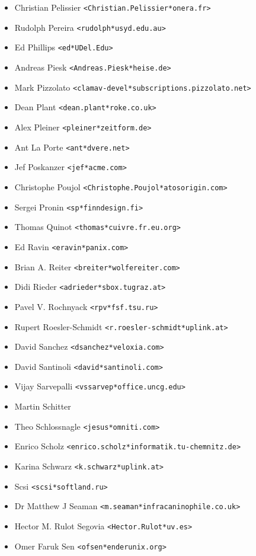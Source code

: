 \documentclass[a4paper,titlepage,12pt]{article}
\newcommand{\email}[1]{\texttt{#1}}
\begin{document}
\begin{itemize}
	\item Christian Pelissier \email{<Christian.Pelissier*onera.fr>}
	\item Rudolph Pereira \email{<rudolph*usyd.edu.au>}
	\item Ed Phillips \email{<ed*UDel.Edu>}
	\item Andreas Piesk \email{<Andreas.Piesk*heise.de>}
	\item Mark Pizzolato \email{<clamav-devel*subscriptions.pizzolato.net>}
	\item Dean Plant \email{<dean.plant*roke.co.uk>}
	\item Alex Pleiner \email{<pleiner*zeitform.de>}
	\item Ant La Porte \email{<ant*dvere.net>}
	\item Jef Poskanzer \email{<jef*acme.com>}
	\item Christophe Poujol \email{<Christophe.Poujol*atosorigin.com>}
	\item Sergei Pronin \email{<sp*finndesign.fi>}
	\item Thomas Quinot \email{<thomas*cuivre.fr.eu.org>}
	\item Ed Ravin \email{<eravin*panix.com>}
	\item Brian A. Reiter \email{<breiter*wolfereiter.com>}
	\item Didi Rieder \email{<adrieder*sbox.tugraz.at>}
	\item Pavel V. Rochnyack \email{<rpv*fsf.tsu.ru>}
	\item Rupert Roesler-Schmidt \email{<r.roesler-schmidt*uplink.at>}
	\item David Sanchez \email{<dsanchez*veloxia.com>}
	\item David Santinoli \email{<david*santinoli.com>}
	\item Vijay Sarvepalli \email{<vssarvep*office.uncg.edu>}
	\item Martin Schitter
	\item Theo Schlossnagle \email{<jesus*omniti.com>}
	\item Enrico Scholz \email{<enrico.scholz*informatik.tu-chemnitz.de>}
	\item Karina Schwarz \email{<k.schwarz*uplink.at>}
	\item Scsi \email{<scsi*softland.ru>}
	\item Dr Matthew J Seaman \email{<m.seaman*infracaninophile.co.uk>}
	\item Hector M. Rulot Segovia \email{<Hector.Rulot*uv.es>}
	\item Omer Faruk Sen \email{<ofsen*enderunix.org>}

\end{itemize}
\end{document}
